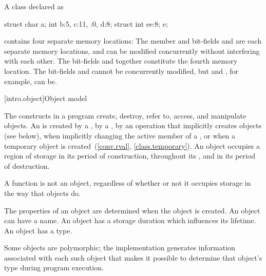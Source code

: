 \pnum
\begin{example}
A class declared as
\begin{codeblock}
struct {
  char a;
  int b:5,
  c:11,
  :0,
  d:8;
  struct {int ee:8;} e;
}
\end{codeblock}
contains four separate memory locations: The member  and bit-fields
 and  are each separate memory locations, and can be
modified concurrently without interfering with each other. The bit-fields
 and  together constitute the fourth memory location. The
bit-fields  and  cannot be concurrently modified, but
 and , for example, can be.
\end{example}

[intro.object]{Object model}

\pnum
{}%
The constructs in a \Cpp{} program create, destroy, refer to, access, and
manipulate objects.
An  is created
by a ,
by a ,
by an operation that implicitly creates objects (see below),
when implicitly changing the active member of a ,
or
when a temporary object is created~(\ref{conv.rval}, \ref{class.temporary}).
An object occupies a region of storage
in its period of construction,
throughout its ,
and
in its period of destruction.
\begin{note}
A function is not an object, regardless of whether or not it
occupies storage in the way that objects do.
\end{note}
The properties of an
object are determined when the object is created. An object can have a
name. An object has a storage
duration which influences its
lifetime. An object has a
type.
\begin{note}
Some objects are
polymorphic; the implementation
generates information associated with each such object that makes it
possible to determine that object's type during program execution.
\end{note}

